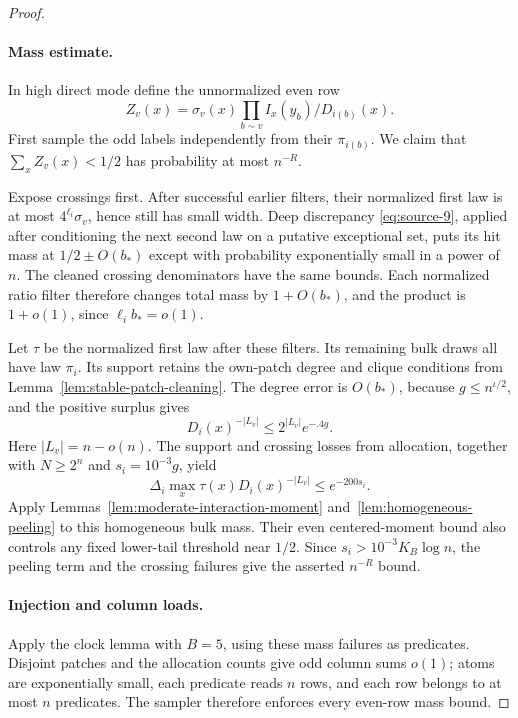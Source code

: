 \begin{proof}\leavevmode\par
\paragraph{Mass estimate.}
In high direct mode define the unnormalized even row
\[
 Z_v(x)=\sigma_v(x)\prod_{b\sim v} I_x(y_b)/D_{i(b)}(x).
\]
First sample the odd labels independently from their \(\pi_{i(b)}\). We claim that \(\sum_xZ_v(x)<1/2\) has probability at most \(n^{-R}\).

Expose crossings first. After successful earlier filters, their normalized first law is at most \(4^{\ell_i}\sigma_v\), hence still has small width. Deep discrepancy \eqref{eq:source-9}, applied after conditioning the next second law on a putative exceptional set, puts its hit mass at \(1/2\pm O(b_*)\) except with probability exponentially small in a power of \(n\). The cleaned crossing denominators have the same bounds. Each normalized ratio filter therefore changes total mass by \(1+O(b_*)\), and the product is \(1+o(1)\), since \(\ell_i b_*=o(1)\).

Let \(\tau\) be the normalized first law after these filters. Its remaining bulk draws all have law \(\pi_i\). Its support retains the own-patch degree and clique conditions from Lemma~\ref{lem:stable-patch-cleaning}. The degree error is \(O(b_*)\), because \(g\le n^{\iota/2}\), and the positive surplus gives
\[
 D_i(x)^{-|L_v|}\le2^{|L_v|}e^{-.4g}.
\]
Here \(|L_v|=n-o(n)\). The support and crossing losses from allocation, together with \(N\ge2^n\) and \(s_i=10^{-3}g\), yield
\[
 \Delta_i\max_x\tau(x)D_i(x)^{-|L_v|}\le e^{-200s_i}.
\]
Apply Lemmas~\ref{lem:moderate-interaction-moment} and~\ref{lem:homogeneous-peeling} to this homogeneous bulk mass. Their even centered-moment bound also controls any fixed lower-tail threshold near \(1/2\). Since \(s_i>10^{-3}K_B\log n\), the peeling term and the crossing failures give the asserted \(n^{-R}\) bound.

\paragraph{Injection and column loads.}
Apply the clock lemma with \(B=5\), using these mass failures as predicates. Disjoint patches and the allocation counts give odd column sums \(o(1)\); atoms are exponentially small, each predicate reads \(n\) rows, and each row belongs to at most \(n\) predicates. The sampler therefore enforces every even-row mass bound.


\end{proof}
